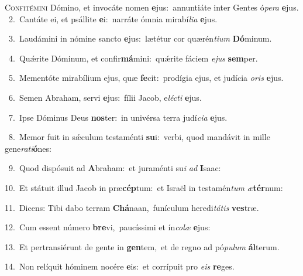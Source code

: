 \lettrine{\initial\textcolor{\initialcolor}{C}}{onfitémini} Dómino, et invocáte nomen \textbf{e}\-jus:~\star annuntiáte inter Gentes ó\-\textit{pe}\-\textit{ra} \textbf{e}\-jus.\\
{\numbfont\textcolor{\numbcolor}{~2.}}~Cantáte ei, et psállite \textbf{e}\-i:~\star narráte ómnia mirabí\-\textit{li}\-\textit{a} \textbf{e}\-jus.\par
{\numbfont\textcolor{\numbcolor}{~3.}}~Laudámini in nómine sancto \textbf{e}\-jus:~\star lætétur cor quærén\-\textit{ti}\-\textit{um} \textbf{Dó}\-minum.\par
{\numbfont\textcolor{\numbcolor}{~4.}}~Quǽrite Dóminum, et confir\-\textbf{má}\-mini:~\star quǽrite fáciem \textit{e}\-\textit{jus} \textbf{sem}\-per.\par
{\numbfont\textcolor{\numbcolor}{~5.}}~Mementóte mirabílium ejus, quæ \textbf{fe}\-cit:~\star prodígia ejus, et judícia \textit{o}\-\textit{ris} \textbf{e}\-jus.\par
{\numbfont\textcolor{\numbcolor}{~6.}}~Semen Abraham, servi \textbf{e}\-jus:~\star fílii Jacob, e\-\textit{léc}\-\textit{ti} \textbf{e}\-jus.\par
{\numbfont\textcolor{\numbcolor}{~7.}}~Ipse Dóminus Deus \textbf{nos}\-ter:~\star in univérsa terra judí\-\textit{ci}\-\textit{a} \textbf{e}\-jus.\par
{\numbfont\textcolor{\numbcolor}{~8.}}~Memor fuit in sǽculum testaménti \textbf{su}\-i:~\star verbi, quod mandávit in mille gene\-\textit{ra}\-\textit{ti}\textbf{ó}nes:\par
{\numbfont\textcolor{\numbcolor}{~9.}}~Quod dispósuit ad \textbf{A}\-braham:~\star et juraménti su\textit{i} \textit{ad} \textbf{I}\-saac:\par
{\numbfont\textcolor{\numbcolor}{10.}}~Et státuit illud Jacob in præ\-\textbf{cép}\-tum:~\star et Israël in testamén\textit{tum} \textit{æ}\-\textbf{tér}num:\par
{\numbfont\textcolor{\numbcolor}{11.}}~Dicens: Tibi dabo terram \textbf{Chá}\-naan,~\star funículum heredi\-\textit{tá}\-\textit{tis} \textbf{ves}\-træ.\par
{\numbfont\textcolor{\numbcolor}{12.}}~Cum essent número \textbf{bre}\-vi,~\star paucíssimi et ín\-\textit{co}\-\textit{læ} \textbf{e}\-jus:\par
{\numbfont\textcolor{\numbcolor}{13.}}~Et pertransiérunt de gente in \textbf{gen}\-tem,~\star et de regno ad pó\-\textit{pu}\-\textit{lum} \textbf{ál}\-terum.\par
{\numbfont\textcolor{\numbcolor}{14.}}~Non relíquit hóminem nocére \textbf{e}\-is:~\star et corrípuit pro \textit{e}\-\textit{is} \textbf{re}\-ges.\par
